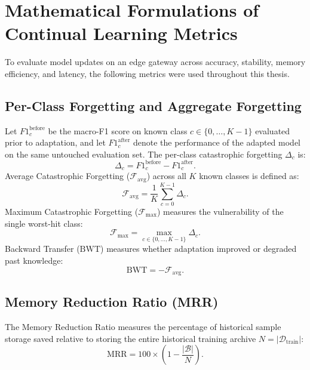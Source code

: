 \section{Mathematical Formulations of Continual Learning Metrics}
\label{app:metric_formulations}

To evaluate model updates on an edge gateway across accuracy, stability, memory efficiency, and latency, the following metrics were used throughout this thesis.

\subsection{Per-Class Forgetting and Aggregate Forgetting}
Let $F1_{c}^{\text{before}}$ be the macro-F1 score on known class $c \in \{0, \dots, K-1\}$ evaluated prior to adaptation, and let $F1_{c}^{\text{after}}$ denote the performance of the adapted model on the same untouched evaluation set. The per-class catastrophic forgetting $\Delta_c$ is:
\begin{equation}
\Delta_c = F1_{c}^{\text{before}} - F1_{c}^{\text{after}}.
\end{equation}
Average Catastrophic Forgetting ($\mathcal{F}_{\text{avg}}$) across all $K$ known classes is defined as:
\begin{equation}
\mathcal{F}_{\text{avg}} = \frac{1}{K} \sum_{c=0}^{K-1} \Delta_c.
\end{equation}
Maximum Catastrophic Forgetting ($\mathcal{F}_{\max}$) measures the vulnerability of the single worst-hit class:
\begin{equation}
\mathcal{F}_{\max} = \max_{c \in \{0, \dots, K-1\}} \Delta_c.
\end{equation}
Backward Transfer ($\text{BWT}$) measures whether adaptation improved or degraded past knowledge:
\begin{equation}
\text{BWT} = -\mathcal{F}_{\text{avg}}.
\end{equation}

\subsection{Memory Reduction Ratio (MRR)}
The Memory Reduction Ratio measures the percentage of historical sample storage saved relative to storing the entire historical training archive $N = |\mathcal{D}_{\text{train}}|$:
\begin{equation}
\text{MRR} = 100 \times \left( 1 - \frac{|\mathcal{B}|}{N} \right).
\end{equation}

